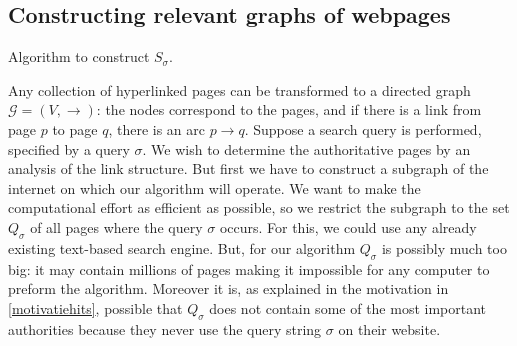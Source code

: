 \documentclass[a4paper,11pt]{report}
\newcommand{\graf}{\mathscr{G}}
\begin{document}
\subsection{Constructing relevant graphs of webpages}
\begin{algorithm}[t!]

\SetAlgoLined
 
 \caption{Algorithm to construct $S_\sigma$.}\label{algoritmegraf}
\end{algorithm}
Any collection of hyperlinked pages can be transformed to a directed graph $\graf = (V, 
\to)$: the nodes correspond to the pages, and if there is a link from page $p$ 
to page $q$, there is an arc $p \to q$. Suppose a search query is performed, 
specified by a query $\sigma$. We wish to determine the authoritative 
pages by an analysis of the link structure. But first we have to construct a 
subgraph of the internet on which our algorithm will operate. We want to make the 
computational effort as efficient as possible, so we restrict the subgraph to 
the set $Q_\sigma$ of all pages where the query $\sigma$ occurs. For this, we could use
any already existing text-based search engine.  But, for our algorithm $Q_\sigma$ 
is possibly much too big: it may contain millions of pages making it impossible 
for any computer to preform the algorithm. Moreover it is, as explained in the motivation in \ref{motivatiehits}, possible that $Q_\sigma$ 
does not contain some of the most important authorities because they never use 
the query string $\sigma$ on their website.
\end{document}
